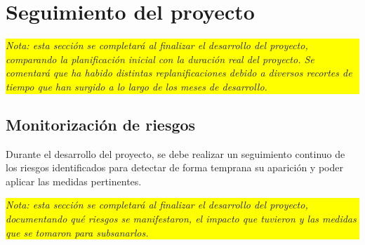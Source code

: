 \section{Seguimiento del proyecto}\label{cap:planificacionFinal}

\colorbox{yellow}{\parbox{\dimexpr\linewidth-2\fboxsep}{\textit{Nota: esta sección se completará al finalizar el desarrollo del proyecto, comparando la planificación inicial con la duración real del proyecto. Se comentará que ha habido distintas replanificaciones debido a diversos recortes de tiempo que han surgido a lo largo de los meses de desarrollo.}}}

\subsection{Monitorización de riesgos}

Durante el desarrollo del proyecto, se debe realizar un seguimiento continuo de los riesgos identificados para detectar de forma temprana su aparición y poder aplicar las medidas pertinentes.

\colorbox{yellow}{\parbox{\dimexpr\linewidth-2\fboxsep}{\textit{Nota: esta sección se completará al finalizar el desarrollo del proyecto, documentando qué riesgos se manifestaron, el impacto que tuvieron y las medidas que se tomaron para subsanarlos.}}}
